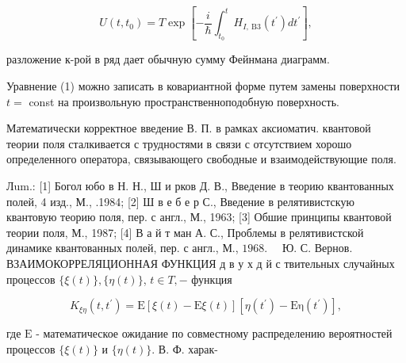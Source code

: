 \documentclass[10pt]{article}
\begin{document}
\[

U\left(t, t_{0}\right)=T \exp \left[-\frac{i}{\hbar} \int_{t_{0}}^{t} H_{I, \mathrm{~B} 3}\left(t^{\prime}\right) d t^{\prime}\right],

\]



разложение к-рой в ряд дает обычную сумму Фейнмана диаграмм.



Уравнение (1) можно записать в ковариантной форме путем замены поверхности $t=$ const на произвольную пространственноподобную поверхность.



Математически корректное введение В. П. в рамках аксиоматич. квантовой теории поля сталкивается с трудностями в связи с отсутствием хорошо определенного оператора, связывающего свободные и взаимодействующие поля.



Лum.: [1] Богол юбо в Н. Н., Ш и рков Д. В., Введение в теорию квантованных полей, 4 изд., М., .1984; [2] Ш в е б е р С., Введение в релятивистскую квантовую теорию поля, пер. с англ., М., 1963; [3] Обшие принципы квантовой теории поля, М., 1987; [4] В а й т ман А. С., Проблемы в релятивистской динамике квантованных полей, пер. с англ., М., $1968 . \quad$ Ю. С. Вернов. ВЗАИМОКОРРЕЛЯЦИОННАЯ ФУНКЦИЯ д в у х д й с твительных случайных процессов $\{\xi(t)\},\{\eta(t)\}$, $t \in T,-$ функция



\[

K_{\xi \eta}\left(t, t^{\prime}\right)=\mathrm{E}[\xi(t)-\mathrm{E} \xi(t)]\left[\eta\left(t^{\prime}\right)-\mathrm{E \eta}\left(t^{\prime}\right)\right],

\]



где $\mathrm{E}$ - математическое ожидание по совместному распределению вероятностей процессов $\{\xi(t)\}$ и $\{\eta(t)\}$. В. Ф. харак-
\end{document}
